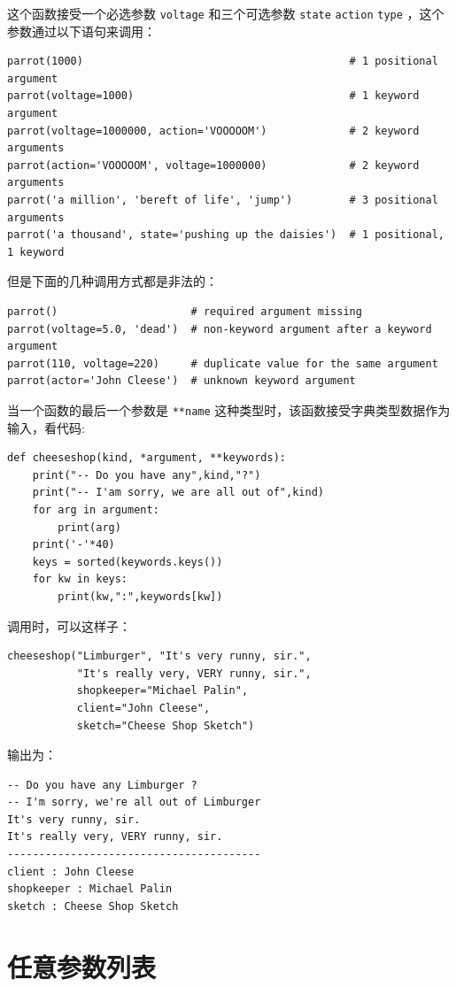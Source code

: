 \documentclass[10pt,a4paper,UTF8]{article}
\begin{document}
这个函数接受一个必选参数 \texttt{voltage} 和三个可选参数 \texttt{state} \texttt{action} \texttt{type} ，这个参数通过以下语句来调用：
\begin{verbatim}
parrot(1000)                                          # 1 positional argument
parrot(voltage=1000)                                  # 1 keyword argument
parrot(voltage=1000000, action='VOOOOOM')             # 2 keyword arguments
parrot(action='VOOOOOM', voltage=1000000)             # 2 keyword arguments
parrot('a million', 'bereft of life', 'jump')         # 3 positional arguments
parrot('a thousand', state='pushing up the daisies')  # 1 positional, 1 keyword
\end{verbatim}

但是下面的几种调用方式都是非法的：
\begin{verbatim}
parrot()                     # required argument missing
parrot(voltage=5.0, 'dead')  # non-keyword argument after a keyword argument
parrot(110, voltage=220)     # duplicate value for the same argument
parrot(actor='John Cleese')  # unknown keyword argument
\end{verbatim}

当一个函数的最后一个参数是 \texttt{**name} 这种类型时，该函数接受字典类型数据作为输入，看代码:
\lstset{language=Python,label= ,caption= ,captionpos=b,firstnumber=1,numbers=left}
\begin{lstlisting}
def cheeseshop(kind, *argument, **keywords):
    print("-- Do you have any",kind,"?")
    print("-- I'am sorry, we are all out of",kind)
    for arg in argument:
        print(arg)
    print('-'*40)
    keys = sorted(keywords.keys())
    for kw in keys:
        print(kw,":",keywords[kw])
\end{lstlisting}

调用时，可以这样子：
\begin{verbatim}
cheeseshop("Limburger", "It's very runny, sir.",
           "It's really very, VERY runny, sir.",
           shopkeeper="Michael Palin",
           client="John Cleese",
           sketch="Cheese Shop Sketch")
\end{verbatim}
输出为：
\begin{verbatim}
-- Do you have any Limburger ?
-- I'm sorry, we're all out of Limburger
It's very runny, sir.
It's really very, VERY runny, sir.
----------------------------------------
client : John Cleese
shopkeeper : Michael Palin
sketch : Cheese Shop Sketch
\end{verbatim}
\section{任意参数列表}
\label{sec:org487d3e0}
\end{document}
